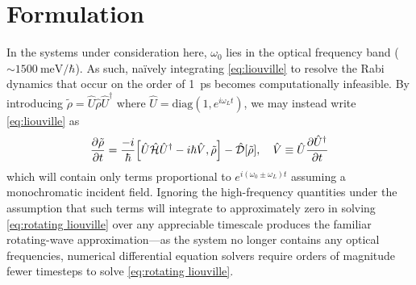 \section{Formulation}


In the systems under consideration here, $\omega_0$ lies in the optical frequency band ($\sim \SI{1500}{\milli\eV\per\hbar}$).
As such, na\"ively integrating \cref{eq:liouville} to resolve the Rabi dynamics that occur on the order of \SI{1}{\pico\second} becomes computationally infeasible.
By introducing $\tilde{\rho} = \hat{U} \hat{\rho} \hat{U}^\dagger$ where $\hat{U} = \mathrm{diag}(1, e^{i \omega_L t})$, we may instead write \cref{eq:liouville} as
\begin{equation}
  \pdv{\tilde{\rho}}{t} = \frac{-i}{\hbar} \commutator{\hat{U} \hat{\mathcal{H}} \hat{U}^\dagger - i \hbar \hat{V}}{\tilde{\rho}} - \hat{\mathcal{D}}\qty[\tilde{\rho}], \quad \hat{V} \equiv \hat{U} \pdv{\hat{U}^\dagger}{t}
  \label{eq:rotating liouville}
\end{equation}
which will contain only terms proportional to $e^{i (\omega_0 \pm \omega_L) t}$ assuming a monochromatic incident field.
Ignoring the high-frequency quantities under the assumption that such terms will integrate to approximately zero in solving \cref{eq:rotating liouville} over any appreciable timescale produces the familiar rotating-wave approximation\cite{Allen1975}---as the system no longer contains any optical frequencies, numerical differential equation solvers require orders of magnitude fewer timesteps to solve \cref{eq:rotating liouville}.



